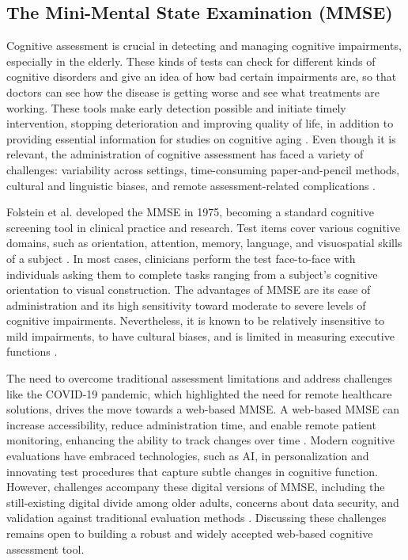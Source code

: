 \subsection{The Mini-Mental State Examination (MMSE)}

Cognitive assessment is crucial in detecting and managing cognitive impairments, especially in the elderly. These kinds of tests can check for different kinds of cognitive disorders and give an idea of how bad certain impairments are, so that doctors can see how the disease is getting worse and see what treatments are working. These tools make early detection possible and initiate timely intervention, stopping deterioration and improving quality of life, in addition to providing essential information for studies on cognitive aging \cite{Langa2015, Petersen2018, Weintraub2009}. Even though it is relevant, the administration of cognitive assessment has faced a variety of challenges: variability across settings, time-consuming paper-and-pencil methods, cultural and linguistic biases, and remote assessment-related complications \cite{Prince2013, Cordell2013, Henrich2010, Goldberg2015, Geddes2020, Bilder2020}.

Folstein et al. \cite{Folstein1975} developed the MMSE in 1975, becoming a standard cognitive screening tool in clinical practice and research. Test items cover various cognitive domains, such as orientation, attention, memory, language, and visuospatial skills of a subject \cite{Folstein1975, Tombaugh1992, Shulman2006}. In most cases, clinicians perform the test face-to-face with individuals asking them to complete tasks ranging from a subject's cognitive orientation to visual construction. The advantages of MMSE are its ease of administration and its high sensitivity toward moderate to severe levels of cognitive impairments. Nevertheless, it is known to be relatively insensitive to mild impairments, to have cultural biases, and is limited in measuring executive functions \cite{Folstein1975}.

The need to overcome traditional assessment limitations and address challenges like the COVID-19 pandemic, which highlighted the need for remote healthcare solutions, drives the move towards a web-based MMSE. A web-based MMSE can increase accessibility, reduce administration time, and enable remote patient monitoring, enhancing the ability to track changes over time \cite{Bauer2012, Seifan2015, Zygouris2017, Geddes2020, Cullum2014, Lim2020, Harrington2021}. Modern cognitive evaluations have embraced technologies, such as AI, in personalization and innovating test procedures that capture subtle changes in cognitive function. However, challenges accompany these digital versions of MMSE, including the still-existing digital divide among older adults, concerns about data security, and validation against traditional evaluation methods \cite{Bilder2020, Wild2021}. Discussing these challenges remains open to building a robust and widely accepted web-based cognitive assessment tool.\\


